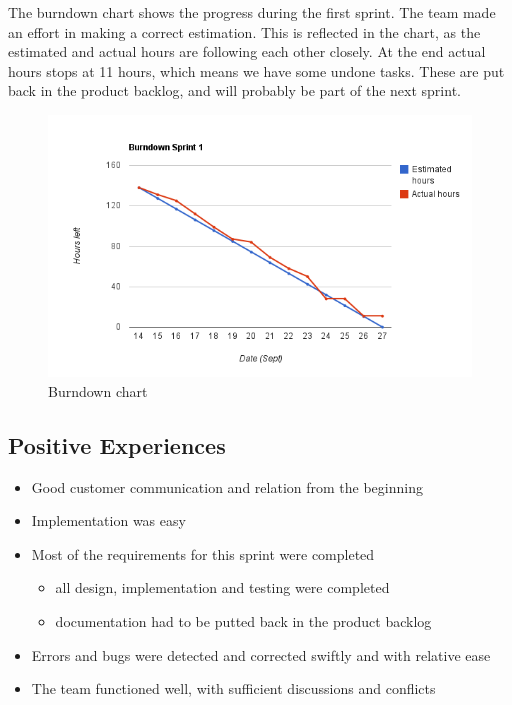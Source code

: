 The burndown chart shows the progress during the first sprint. The team made an effort in making a correct estimation. This is reflected in the chart, as the estimated and actual hours are  following each other closely. At the end actual hours stops at 11 hours, which means we have some undone tasks. These are put back in the product backlog, and will probably be part of the next sprint. 

\begin{figure}[!ht]
\includegraphics[width=\textwidth]{./sprints/img/burndown_chart_s1.png}
\caption{Burndown chart}
\label{fig:sp1_burndown}
\end{figure}

\subsection{Positive Experiences}
\begin{itemize}
	\item Good customer communication and relation from the beginning
	\item Implementation was easy
	\item Most of the requirements for this sprint were completed
	\begin{itemize} 
		\item all design, implementation and testing were completed
		\item documentation had to be putted back in the product backlog 
	\end{itemize}
	\item Errors and bugs were detected and corrected swiftly and with relative ease
	\item The team functioned well, with sufficient discussions and conflicts
\end{itemize}

